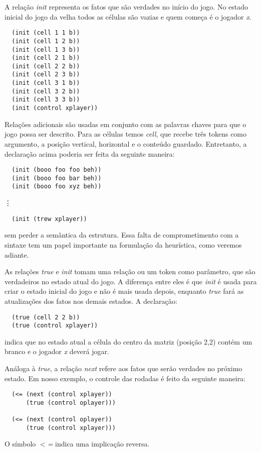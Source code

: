 A relação {\it init} representa os fatos que são verdades no início do jogo.
No estado inicial do jogo da velha todos as células são vazias e quem começa é o
jogador {\it x}.
\begin{verbatim}
  (init (cell 1 1 b))
  (init (cell 1 2 b))
  (init (cell 1 3 b))
  (init (cell 2 1 b))
  (init (cell 2 2 b))
  (init (cell 2 3 b))
  (init (cell 3 1 b))
  (init (cell 3 2 b))
  (init (cell 3 3 b))
  (init (control xplayer))
\end{verbatim}
Relações adicionais são usadas em conjunto com as palavras chaves para que o
jogo possa ser descrito. Para as células temos {\it cell}, que recebe três
tokens como argumento, a posição vertical, horizontal e o conteúdo guardado. 
Entretanto, a declaração acima poderia ser feita da seguinte maneira:
\begin{verbatim}
  (init (booo foo foo beh))
  (init (booo foo bar beh))
  (init (booo foo xyz beh))
\end{verbatim}
\hspace{2cm} \vdots
\begin{verbatim}
  (init (trew xplayer))
\end{verbatim}
sem perder a semântica da estrutura. Essa falta de comprometimento com a sintaxe
tem um papel importante na formulação da heurística, como veremos adiante.
 
As relações {\it true} e {\it init} tomam uma relação ou um token como
parâmetro, que são verdadeiros no estado atual do jogo. A diferença entre eles é
que {\it init} é usada para criar o estado inicial do jogo e não é mais usada
depois, enquanto {\it true} fará as atualizações dos fatos nos demais estados. A
declaração: 
\begin{verbatim}
  (true (cell 2 2 b))
  (true (control xplayer))
\end{verbatim}
indica que no estado atual a célula do centro da matriz (posição 2,2) contém um
branco e o jogador {\it x} deverá jogar.
 
Análoga à {\it true}, a relação {\it next} refere aos fatos que serão verdades
no próximo estado. Em nosso exemplo, o controle das rodadas é feito da seguinte
maneira:
\begin{verbatim}
  (<= (next (control xplayer))
      (true (control oplayer)))
 
  (<= (next (control oplayer))
      (true (control xplayer)))
\end{verbatim}
O símbolo {\it $<$=} indica uma implicação reversa.
 
